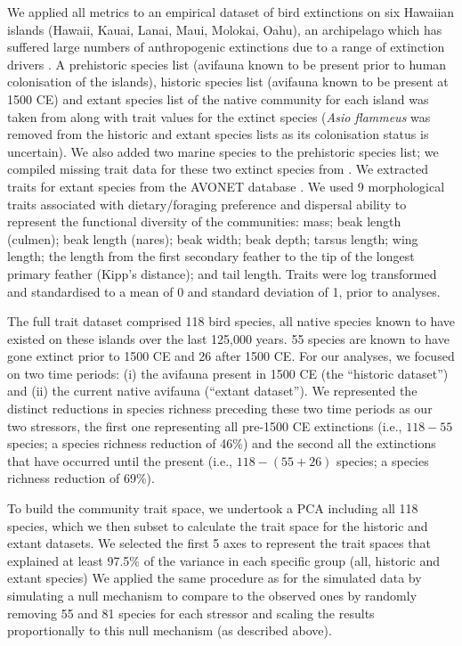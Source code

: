 \documentclass[12pt,letterpaper]{article}
\begin{document}
We applied all metrics to an empirical dataset of bird extinctions on six Hawaiian islands (Hawaii, Kauai, Lanai, Maui, Molokai, Oahu), an archipelago which has suffered large numbers of anthropogenic extinctions due to a range of extinction drivers \citep{Walther2022}.
A prehistoric species list (avifauna known to be present prior to human colonisation of the islands), historic species list (avifauna known to be present at 1500 CE) and extant species list of the native community for each island was taken from \cite{matthews2023global} along with trait values for the extinct species (\textit{Asio flammeus} was removed from the historic and extant species lists as its colonisation status is uncertain).
We also added two marine species to the prehistoric species list; we compiled missing trait data for these two extinct species from \cite{sayol2021loss}.
We extracted traits for extant species from the AVONET database \citep{tobias2022avonet}.
We used 9 morphological traits associated with dietary/foraging preference and dispersal ability \citep{pigot2020macroevolutionary,sheard2020ecological} to represent the functional diversity of the communities: mass; beak length (culmen); beak length (nares); beak width; beak depth; tarsus length; wing length; the length from the first secondary feather to the tip of the longest primary feather (Kipp's distance); and tail length.
Traits were log transformed and standardised to a mean of 0 and standard deviation of 1, prior to analyses.

The full trait dataset comprised 118 bird species, all native species known to have existed on these islands over the last 125,000 years.
55 species are known to have gone extinct prior to 1500 CE and 26 after 1500 CE.
For our analyses, we focused on two time periods: (i) the avifauna present in 1500 CE (the ``historic dataset'') and (ii) the current native avifauna (``extant dataset'').
We represented the distinct reductions in species richness preceding these two time periods as our two stressors, the first one representing all pre-1500 CE extinctions (i.e., $118-55$ species; a species richness reduction of 46\%) and the second all the extinctions that have occurred until the present (i.e., $118-(55+26)$ species; a species richness reduction of 69\%).


To build the community trait space, we undertook a PCA including all 118 species, which we then subset to calculate the trait space for the historic and extant datasets.
We selected the first 5 axes to represent the trait spaces that explained at least 97.5\% of the variance in each specific group (all, historic and extant species)
We applied the same procedure as for the simulated data by simulating a null mechanism to compare to the observed ones by randomly removing 55 and 81 species for each stressor and scaling the results proportionally to this null mechanism (as described above).
\end{document}
